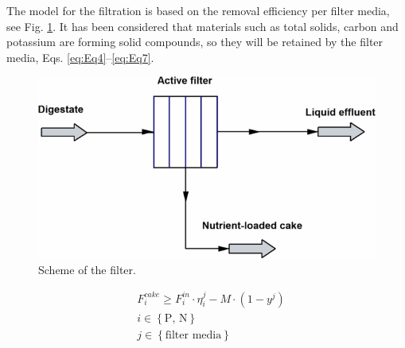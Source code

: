 \begin{refsection}[referencesCh2]
The model for the filtration is based on the removal efficiency per filter media, see Fig. \ref{fig:FilterScheme}. It has been considered that materials such as total solids, carbon and potassium are forming solid compounds, so they will be retained by the filter media, Eqs. \ref{eq:Eq4}–\ref{eq:Eq7}.
\begin{figure}[h!]
	\centering
	\includegraphics[width=0.6\linewidth, trim={0cm 0cm 0cm 0cm},clip]{gfx/Chapter2/Fig2.pdf} 
	\caption{Scheme of the filter.}
	\label{fig:FilterScheme}
\end{figure}

\begin{equation}
	\begin{aligned}
		& F_i^{{cake}} \ge F_i^{{in}} \cdot \eta _i^{j} - M\cdot \left(1 - {y^j}\right) \\
		& {i} \in \left\{ \text{P, N} \right\} \\
		& j \in \left\{ {{\text{filter media}}} \right\} \label{eq:Eq2}
	\end{aligned}
\end{equation}


\end{refsection}
